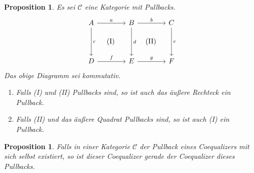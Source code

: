 \documentclass[a4paper, parskip=half]{scrartcl}
\theoremstyle{marginbreak}
\newtheorem{proposition}[remark]{Proposition}
\theoremstyle{nonumberplain}
\newtheorem{proof}{Beweis.}
\newcommand\cat\mathcal
\newcommand{\p}[1]{\iftoggle{proofs}{#1}{}}
\begin{document}
		\begin{proposition}
			Es sei $\cat{C}$ eine Kategorie mit Pullbacks.
			\[
				\begin{tikzcd}[sep=4em]
					A \ar{r}{a} \ar[phantom]{dr}{\text{(I)}} \ar{d}{c} & B \ar[phantom]{dr}{\text{(II)}} \ar{r}{b} \ar{d}{d} & C \ar{d}{e}\\
					D \ar{r}{f} & E \ar{r}{g} & F
				\end{tikzcd}
			\]
			Das obige Diagramm sei kommutativ.
			\begin{enumerate}
				\item Falls (I) und (II) Pullbacks sind, so ist auch das äußere
					Rechteck ein Pullback.
				\item Falls (II) und das äußere Quadrat Pullbacks sind, so ist auch
					(I) ein Pullback.
			\end{enumerate}
		\end{proposition}
		\p{\begin{proof}
			\begin{enumerate}
				\item Es seien $x\colon X\to D$, $y\colon X\to C$ mit $g\circ f\circ x = e\circ y$.
					Pullback (II) liefert ein eindeutiges $z\colon X\to B$, sodass
					$b\circ z = y$, $d\circ z = f\circ x$. Letztere Gleichheit und Pullback
					(I) gibt ein eindeutiges $w\colon X\to A$, sodass $a\circ w = z$, $c\circ w = x$.
					Insbesondere gilt $b\circ a\circ w = b\circ z = y$. Es sei $w'\colon X\to A$ ein
					weiterer Morphismus mit $b\circ a\circ w' = y$ und $c\circ w' = x$. Es gilt also
					$b\circ (a\circ w') = y = b\circ (a\circ w)$ und
					$d\circ(a\circ w') = f\circ (c\circ w') = f\circ x = f\circ c\circ w = d\circ (a\circ w)$.
					Pullback (II) liefert $a\circ w'=a\circ w$. Weiter ist $c\circ w'= x = c\circ w$.
					Pullback (I) liefert $w=w'$.
				\item Es sei $(A', c', a')$ der Pullback von $f$ und $d$. Mit (1) und da (II) ein Pullback ist, ist $(A', c', b\circ a')$ ein Pullback von
					$(g\circ f, e)$. Es ist jedoch auch $(A, c, b\circ a)$ ein Pullback von $(g\circ f, e)$.
					Da Limiten eindeutig sind, folgt $A\cong A'$.
			\end{enumerate}
		\end{proof}}
		\begin{proposition}
			Falls in einer Kategorie $\cat{C}$ der Pullback eines Coequalizers mit sich
			selbst existiert, so ist dieser Coequalizer gerade der Coequalizer dieses Pullbacks.
		\end{proposition}
\end{document}
